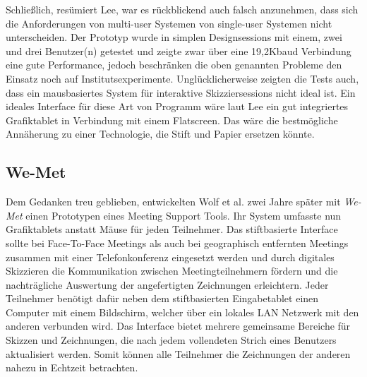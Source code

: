 Schließlich, resümiert Lee, war es rückblickend auch falsch anzunehmen, dass sich die Anforderungen von multi-user Systemen von single-user Systemen nicht unterscheiden. Der Prototyp wurde in simplen Designsessions mit einem, zwei und drei Benutzer(n) getestet und zeigte zwar über eine 19,2Kbaud Verbindung eine gute Performance, jedoch beschränken die oben genannten Probleme den Einsatz noch auf Institutsexperimente.
Unglücklicherweise zeigten die Tests auch, dass ein mausbasiertes System für interaktive Skizziersessions nicht ideal ist. Ein ideales Interface für diese Art von Programm wäre laut Lee ein gut integriertes Grafiktablet in Verbindung mit einem Flatscreen. Das wäre die bestmögliche Annäherung zu einer Technologie, die Stift und Papier ersetzen könnte.
\clearpage


\subsection{We-Met} 
Dem Gedanken treu geblieben, entwickelten Wolf et al. zwei Jahre später mit \emph{We-Met} \citep{Wolf:1997p75} einen Prototypen eines Meeting Support Tools. Ihr System umfasste nun Grafiktablets anstatt Mäuse für jeden Teilnehmer. Das stiftbasierte Interface sollte bei Face-To-Face Meetings als auch bei geographisch entfernten Meetings zusammen mit einer Telefonkonferenz eingesetzt werden und durch digitales Skizzieren die Kommunikation zwischen Meetingteilnehmern fördern und die nachträgliche Auswertung der angefertigten Zeichnungen erleichtern. Jeder Teilnehmer benötigt dafür neben dem stiftbasierten Eingabetablet einen Computer mit einem Bildschirm, welcher über ein lokales LAN Netzwerk mit den anderen verbunden wird. Das Interface bietet mehrere gemeinsame Bereiche für Skizzen und Zeichnungen, die nach jedem vollendeten Strich eines Benutzers aktualisiert werden. Somit können alle Teilnehmer die Zeichnungen der anderen nahezu in Echtzeit betrachten.

